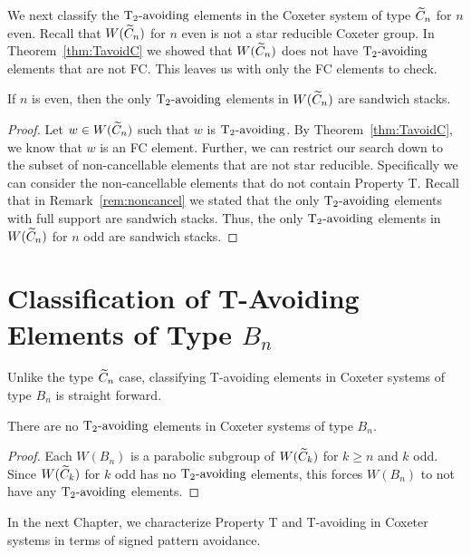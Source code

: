 We next classify the $\operatorname{T_2-\mathrm{avoiding}}$ elements in the Coxeter system of type $\widetilde{C}_n$ for $n$ even. Recall that $W(\widetilde{C}_n)$ for $n$ even is not a star reducible Coxeter group. In Theorem~\ref{thm:TavoidC} we showed that $W(\widetilde{C}_n)$ does not have $\operatorname{T_2-\mathrm{avoiding}}$ elements that are not FC. This leaves us with only the FC elements to check.

\begin{theorem}
	If $n$ is even, then the only $\operatorname{T_2-\mathrm{avoiding}}$ elements in $W(\widetilde{C}_n)$ are sandwich stacks.
	\begin{proof}
		Let $w \in W(\widetilde{C}_n)$ such that $w$ is $\operatorname{T_2-\mathrm{avoiding}}$. By Theorem~\ref{thm:TavoidC}, we know that $w$ is an FC element. Further, we can restrict our search down to the subset of non-cancellable elements that are not star reducible. Specifically we can consider the non-cancellable elements that do not contain Property T. Recall that in Remark~\ref{rem:noncancel} we stated that the only $\operatorname{T_2-\mathrm{avoiding}}$ elements with full support are sandwich stacks. Thus, the only $\operatorname{T_2-\mathrm{avoiding}}$ elements in $W(\widetilde{C}_n)$ for $n$ odd are sandwich stacks.
	\end{proof}
\end{theorem}

\section{Classification of T-Avoiding Elements of Type $B_n$}\label{sec:typeB}

Unlike the type $\widetilde{C}_n$ case, classifying T-avoiding elements in Coxeter systems of type $B_n$ is straight forward. 

\begin{theorem}\label{thm:typeB}
There are no $\operatorname{T_2-\mathrm{avoiding}}$ elements in Coxeter systems of type $B_n$.
\begin{proof}
	Each $W(B_n)$ is a parabolic subgroup of $W(\widetilde{C}_k)$ for $k \geq n$ and $k$ odd. Since $W(\widetilde{C}_k)$ for $k$ odd has no $\operatorname{T_2-\mathrm{avoiding}}$ elements, this forces $W(B_n)$ to not have any $\operatorname{T_2-\mathrm{avoiding}}$ elements.
\end{proof}
\end{theorem}
   
In the next Chapter, we characterize Property T and T-avoiding in Coxeter systems in terms of signed pattern avoidance.   